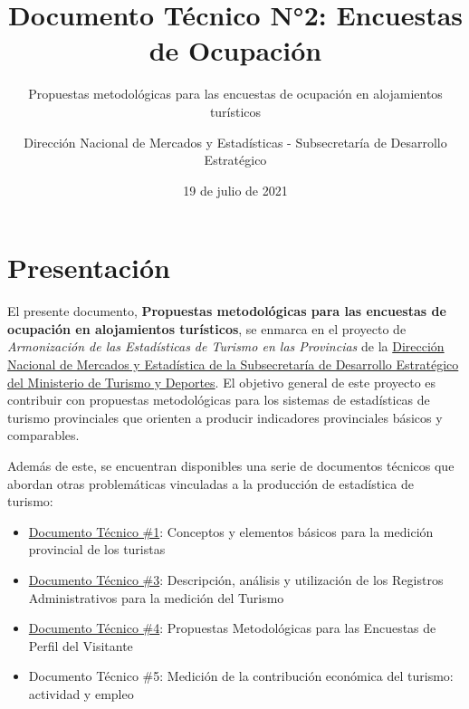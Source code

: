\documentclass[
]{book}
\title{Documento Técnico N°2: Encuestas de Ocupación}
\subtitle{Propuestas metodológicas para las encuestas de ocupación en alojamientos turísticos}
\author{Dirección Nacional de Mercados y Estadísticas - Subsecretaría de Desarrollo Estratégico}
\date{19 de julio de 2021}
\let\oldmaketitle\maketitle
\begin{document}
\maketitle


\newpage

\let\maketitle\oldmaketitle
\maketitle

{
\setcounter{tocdepth}{1}
\tableofcontents
}
\hypertarget{presentaciuxf3n}{%
\chapter*{Presentación}\label{presentaciuxf3n}}

El presente documento, \textbf{Propuestas metodológicas para las encuestas de ocupación en alojamientos turísticos}, se enmarca en el proyecto de \emph{Armonización de las Estadísticas de Turismo en las Provincias} de la \href{http://datos.yvera.gob.ar/}{Dirección Nacional de Mercados y Estadística de la Subsecretaría de Desarrollo Estratégico del Ministerio de Turismo y Deportes}. El objetivo general de este proyecto es contribuir con propuestas metodológicas para los sistemas de estadísticas de turismo provinciales que orienten a producir indicadores provinciales básicos y comparables.

Además de este, se encuentran disponibles una serie de documentos técnicos que abordan otras problemáticas vinculadas a la producción de estadística de turismo:

\begin{itemize}
\item
  \href{https://dnme-minturdep.github.io/DT1_medicion_turismo/}{Documento Técnico \#1}: Conceptos y elementos básicos para la medición provincial de los turistas
\item
  \href{https://dnme-minturdep.github.io/DT3_registros_adminsitrativos/}{Documento Técnico \#3}: Descripción, análisis y utilización de los Registros Administrativos para la medición del Turismo
\item
  \href{https://dnme-minturdep.github.io/DT4_perfiles/}{Documento Técnico \#4}: Propuestas Metodológicas para las Encuestas de Perfil del Visitante
\item
  Documento Técnico \#5: Medición de la contribución económica del turismo: actividad y empleo
\end{itemize}
\end{document}
